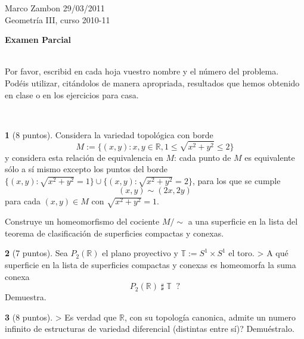 \documentclass[12pt,a4paper]{report}
\theoremstyle{definition}
\newtheorem{ex}{}
\newcommand{\TT}{\ensuremath{\mathbb T}}
\newcommand{\RR}{\ensuremath{\mathbb R}}
\begin{document}
\noindent
{\sffamily\large Marco Zambon 
\hfill     29/03/2011\\Geometr\'ia III, curso 2010-11}
 

\begin{center}\bfseries\large\textsf{Examen Parcial    \vspace{-2mm}}
\end{center}

 

 \noindent
\hrulefill{}\\
\textsf{Por favor, escribid en cada hoja vuestro nombre y el n\'umero del problema.\\
Pod\'eis utilizar, cit\'andolos de manera apropriada, resultados que hemos obtenido en clase o en los ejercicios para casa.    \vspace{-2mm}}

\noindent
\hrulefill{}\\

 
\begin{ex}[8 puntos]    
Considera la variedad topol\'ogica con borde $$M:=\{(x,y):x,y \in \RR,  1 \le \sqrt{x^2+y^2}\le 2\}$$
y considera esta relaci\'on de equivalencia   en $M$: cada punto de $M$ es equivalente s\'olo a s\'i mismo excepto  los puntos del borde $\{(x,y): \sqrt{x^2+y^2}=1\}\cup \{(x,y): \sqrt{x^2+y^2}=2\}$, para los que se cumple
$$(x,y) \sim (2x,2y)$$
para cada $(x,y) \in M$ con $\sqrt{x^2+y^2}=1$.

Construye un homeomorfismo del cociente  $M/\sim$ a una superficie en
la lista del teorema de clasificaci\'on de superficies compactas y conexas.
\end{ex}

\begin{ex} [7 puntos]
Sea $P_2(\RR)$ el plano proyectivo y $\TT:=S^1\times S^1$ el toro. > A qu\'e superficie en la lista de superficies compactas y conexas es homeomorfa la suma conexa $$P_2(\RR) \; \sharp \;  \TT\;\;?$$  
Demuestra.
\end{ex}
 

\begin{ex}  [8 puntos]
> Es verdad que $\RR$, con su topolog\'ia canonica, admite un numero infinito de estructuras  de variedad diferencial (distintas entre s\'i)? Demu\'estralo.
\end{ex}
\end{document}
